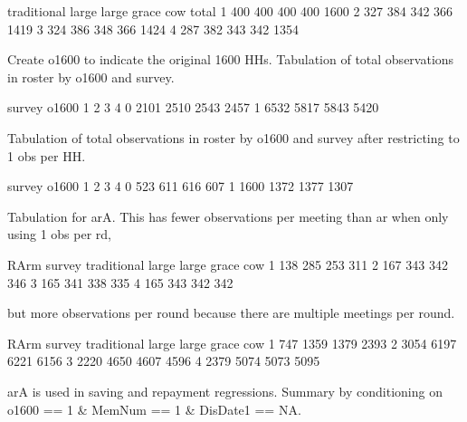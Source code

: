 \begin{Schunk}
\begin{Soutput}
  traditional large large grace cow total
1         400   400         400 400  1600
2         327   384         342 366  1419
3         324   386         348 366  1424
4         287   382         343 342  1354
\end{Soutput}
\end{Schunk}
Create \textsf{o1600} to indicate the original 1600 HHs. Tabulation of total observations in roster by \textsf{o1600} and \textsf{survey}.
\begin{Schunk}
\begin{Soutput}
     survey
o1600    1    2    3    4
    0 2101 2510 2543 2457
    1 6532 5817 5843 5420
\end{Soutput}
\end{Schunk}
Tabulation of total observations in roster by \textsf{o1600} and \textsf{survey} after restricting to 1 obs per HH.
\begin{Schunk}
\begin{Soutput}
     survey
o1600    1    2    3    4
    0  523  611  616  607
    1 1600 1372 1377 1307
\end{Soutput}
\end{Schunk}
Tabulation for \textsf{arA}. This has fewer observations per meeting than \textsf{ar} when only using 1 obs per rd,
\begin{Schunk}
\begin{Soutput}
      RArm
survey traditional large large grace cow
     1         138   285         253 311
     2         167   343         342 346
     3         165   341         338 335
     4         165   343         342 342
\end{Soutput}
\end{Schunk}
but more observations per round because there are multiple meetings per round.
\begin{Schunk}
\begin{Soutput}
      RArm
survey traditional large large grace  cow
     1         747  1359        1379 2393
     2        3054  6197        6221 6156
     3        2220  4650        4607 4596
     4        2379  5074        5073 5095
\end{Soutput}
\end{Schunk}
\textsf{arA} is used in saving and repayment regressions. Summary by conditioning on \textsf{o1600} == 1 \& \textsf{MemNum} == 1 \& \textsf{DisDate1} == NA.

